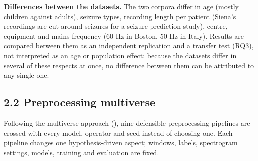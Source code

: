 \documentclass[11pt,a4paper]{article}
\begin{document}
\textbf{Differences between the datasets.} The two corpora differ in age (mostly children
against adults), seizure types, recording length per patient (Siena's
recordings are cut around seizures for a seizure prediction study), centre,
equipment and mains frequency (60 Hz in Boston, 50 Hz in Italy). Results are
compared between them as an independent replication and a transfer test (RQ3), not
interpreted as an age or population effect: because the datasets differ in several of
these respects at once, no difference between them can be attributed to any single
one.

\subsection{2.2 Preprocessing multiverse}\label{preprocessing-multiverse}

Following the multiverse approach (\citealp{Steegen_2016}), nine defensible
preprocessing pipelines are crossed with every model, operator and seed instead of
choosing one. Each pipeline changes one hypothesis-driven aspect; windows, labels,
spectrogram settings, models, training and evaluation are fixed.

\begingroup\small
\end{document}
